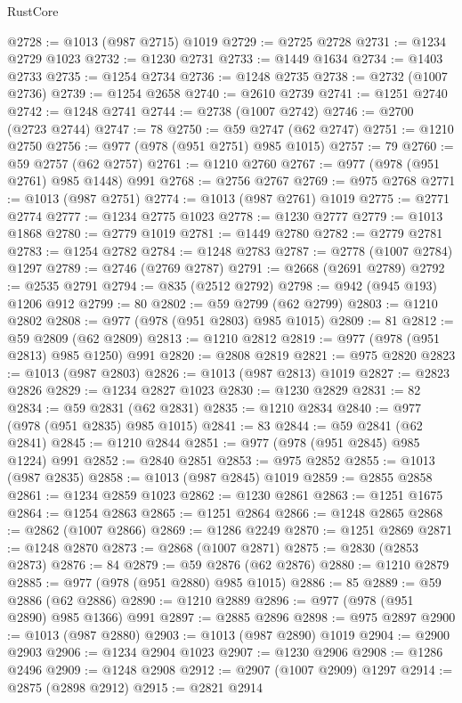 \begin{lexlean}{RustCore}
\begin{coremodule}
@2728 := @1013 (@987 @2715) @1019
@2729 := @2725 @2728
@2731 := @1234 @2729 @1023
@2732 := @1230 @2731
@2733 := @1449 @1634
@2734 := @1403 @2733
@2735 := @1254 @2734
@2736 := @1248 @2735
@2738 := @2732 (@1007 @2736)
@2739 := @1254 @2658
@2740 := @2610 @2739
@2741 := @1251 @2740
@2742 := @1248 @2741
@2744 := @2738 (@1007 @2742)
@2746 := @2700 (@2723 @2744)
@2747 := 78
@2750 := @59 @2747 (@62 @2747)
@2751 := @1210 @2750
@2756 := @977 (@978 (@951 @2751) @985 @1015)
@2757 := 79
@2760 := @59 @2757 (@62 @2757)
@2761 := @1210 @2760
@2767 := @977 (@978 (@951 @2761) @985 @1448) @991
@2768 := @2756 @2767
@2769 := @975 @2768
@2771 := @1013 (@987 @2751)
@2774 := @1013 (@987 @2761) @1019
@2775 := @2771 @2774
@2777 := @1234 @2775 @1023
@2778 := @1230 @2777
@2779 := @1013 @1868
@2780 := @2779 @1019
@2781 := @1449 @2780
@2782 := @2779 @2781
@2783 := @1254 @2782
@2784 := @1248 @2783
@2787 := @2778 (@1007 @2784) @1297
@2789 := @2746 (@2769 @2787)
@2791 := @2668 (@2691 @2789)
@2792 := @2535 @2791
@2794 := @835 (@2512 @2792)
@2798 := @942 (@945 @193) @1206 @912
@2799 := 80
@2802 := @59 @2799 (@62 @2799)
@2803 := @1210 @2802
@2808 := @977 (@978 (@951 @2803) @985 @1015)
@2809 := 81
@2812 := @59 @2809 (@62 @2809)
@2813 := @1210 @2812
@2819 := @977 (@978 (@951 @2813) @985 @1250) @991
@2820 := @2808 @2819
@2821 := @975 @2820
@2823 := @1013 (@987 @2803)
@2826 := @1013 (@987 @2813) @1019
@2827 := @2823 @2826
@2829 := @1234 @2827 @1023
@2830 := @1230 @2829
@2831 := 82
@2834 := @59 @2831 (@62 @2831)
@2835 := @1210 @2834
@2840 := @977 (@978 (@951 @2835) @985 @1015)
@2841 := 83
@2844 := @59 @2841 (@62 @2841)
@2845 := @1210 @2844
@2851 := @977 (@978 (@951 @2845) @985 @1224) @991
@2852 := @2840 @2851
@2853 := @975 @2852
@2855 := @1013 (@987 @2835)
@2858 := @1013 (@987 @2845) @1019
@2859 := @2855 @2858
@2861 := @1234 @2859 @1023
@2862 := @1230 @2861
@2863 := @1251 @1675
@2864 := @1254 @2863
@2865 := @1251 @2864
@2866 := @1248 @2865
@2868 := @2862 (@1007 @2866)
@2869 := @1286 @2249
@2870 := @1251 @2869
@2871 := @1248 @2870
@2873 := @2868 (@1007 @2871)
@2875 := @2830 (@2853 @2873)
@2876 := 84
@2879 := @59 @2876 (@62 @2876)
@2880 := @1210 @2879
@2885 := @977 (@978 (@951 @2880) @985 @1015)
@2886 := 85
@2889 := @59 @2886 (@62 @2886)
@2890 := @1210 @2889
@2896 := @977 (@978 (@951 @2890) @985 @1366) @991
@2897 := @2885 @2896
@2898 := @975 @2897
@2900 := @1013 (@987 @2880)
@2903 := @1013 (@987 @2890) @1019
@2904 := @2900 @2903
@2906 := @1234 @2904 @1023
@2907 := @1230 @2906
@2908 := @1286 @2496
@2909 := @1248 @2908
@2912 := @2907 (@1007 @2909) @1297
@2914 := @2875 (@2898 @2912)
@2915 := @2821 @2914

\end{coremodule}
\end{lexlean}
